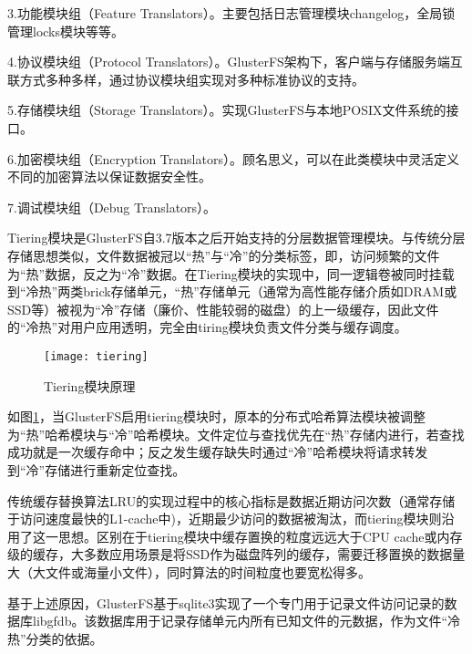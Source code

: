 3.功能模块组（Feature Translators）。主要包括日志管理模块changelog，全局锁管理locks模块等等。

4.协议模块组（Protocol Translators）。GlusterFS架构下，客户端与存储服务端互联方式多种多样，通过协议模块组实现对多种标准协议的支持。

5.存储模块组（Storage Translators）。实现GlusterFS与本地POSIX文件系统的接口。

6.加密模块组（Encryption Translators）。顾名思义，可以在此类模块中灵活定义不同的加密算法以保证数据安全性。

7.调试模块组（Debug Translators）。

Tiering模块是GlusterFS自3.7版本之后开始支持的分层数据管理模块\cite{Tiering}。与传统分层存储思想类似，文件数据被冠以“热”与“冷”的分类标签，即，访问频繁的文件为“热”数据，反之为“冷”数据。在Tiering模块的实现中，同一逻辑卷被同时挂载到“冷热”两类brick存储单元，“热”存储单元（通常为高性能存储介质如DRAM或SSD等）被视为“冷”存储（廉价、性能较弱的磁盘）的上一级缓存，因此文件的“冷热”对用户应用透明，完全由tiring模块负责文件分类与缓存调度。

\begin{figure}[htp]
\centering
\texttt{[image: tiering]}
\caption{Tiering模块原理}
\label{fig:tiering}
\end{figure}

如图\ref{fig:tiering}，当GlusterFS启用tiering模块时，原本的分布式哈希算法模块被调整为“热”哈希模块与“冷”哈希模块。文件定位与查找优先在“热”存储内进行，若查找成功就是一次缓存命中；反之发生缓存缺失时通过“冷”哈希模块将请求转发到“冷”存储进行重新定位查找。

传统缓存替换算法LRU的实现过程中的核心指标是数据近期访问次数（通常存储于访问速度最快的L1-cache中)，近期最少访问的数据被淘汰，而tiering模块则沿用了这一思想。区别在于tiering模块中缓存置换的粒度远远大于CPU cache或内存级的缓存，大多数应用场景是将SSD作为磁盘阵列的缓存，需要迁移置换的数据量大（大文件或海量小文件），同时算法的时间粒度也要宽松得多。

基于上述原因，GlusterFS基于sqlite3实现了一个专门用于记录文件访问记录的数据库libgfdb。该数据库用于记录存储单元内所有已知文件的元数据，作为文件“冷热”分类的依据。

